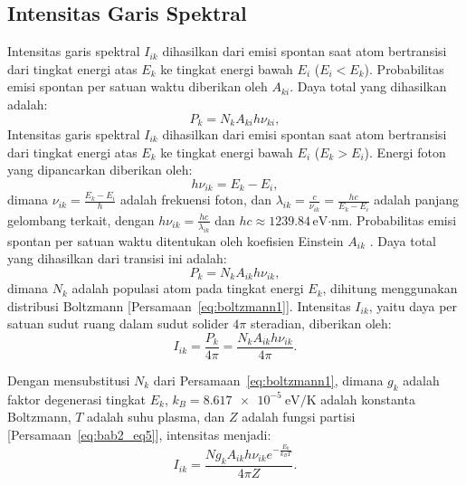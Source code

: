 \subsection{Intensitas Garis Spektral}
Intensitas garis spektral \( I_{ik} \) dihasilkan dari emisi spontan saat atom bertransisi dari tingkat energi atas \( E_k \) ke tingkat energi bawah \( E_i \) (\( E_i < E_k \)). Probabilitas emisi spontan per satuan waktu diberikan oleh \( A_{ki} \). Daya total yang dihasilkan adalah:
\begin{equation}
P_{k} = N_k A_{ki} h \nu_{ki}, \label{eq:bab2_eq6}
\end{equation}
Intensitas garis spektral \( I_{ik} \) dihasilkan dari emisi spontan saat atom bertransisi dari tingkat energi atas \( E_k \) ke tingkat energi bawah \( E_i \) (\( E_k > E_i \)). Energi foton yang dipancarkan diberikan oleh:
\begin{equation}
h \nu_{ik} = E_k - E_i, \label{eq:bab2_eq7}
\end{equation}
dimana \( \nu_{ik} = \frac{E_k - E_i}{h} \) adalah frekuensi foton, dan \( \lambda_{ik} = \frac{c}{\nu_{ik}} = \frac{h c}{E_k - E_i} \) adalah panjang gelombang terkait, dengan \( h \nu_{ik} = \frac{h c}{\lambda_{ik}} \) dan \( hc \approx 1239.84 \, \text{eV·nm} \). Probabilitas emisi spontan per satuan waktu ditentukan oleh koefisien Einstein \( A_{ik} \) \citep{Rybicki1985}. Daya total yang dihasilkan dari transisi ini adalah:
\begin{equation}
P_k = N_k A_{ik} h \nu_{ik}, \label{eq:bab2_eq8}
\end{equation}
dimana \( N_k \) adalah populasi atom pada tingkat energi \( E_k \), dihitung menggunakan distribusi Boltzmann [Persamaan~\eqref{eq:boltzmann1}]. Intensitas \( I_{ik} \), yaitu daya per satuan sudut ruang dalam sudut solider \( 4\pi \) steradian, diberikan oleh:
\begin{equation}
I_{ik} = \frac{P_k}{4\pi} = \frac{N_k A_{ik} h \nu_{ik}}{4\pi}. \label{eq:bab2_eq9}
\end{equation}

Dengan mensubstitusi \( N_k \) dari Persamaan~\eqref{eq:boltzmann1}, dimana \( g_k \) adalah faktor degenerasi tingkat \( E_k \), \( k_B = \SI{8.617e-5}{\electronvolt\per\kelvin} \) adalah konstanta Boltzmann, \( T \) adalah suhu plasma, dan \( Z \) adalah fungsi partisi [Persamaan~\eqref{eq:bab2_eq5}], intensitas menjadi:
\begin{equation}
I_{ik} = \frac{N g_k A_{ik} h \nu_{ik} e^{-\frac{E_k}{k_B T}}}{4\pi Z}. \label{eq:bab2_eq10}
\end{equation}

